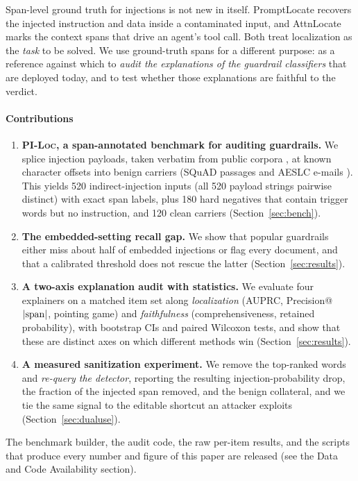 \documentclass{ieeeaccess}
\begin{document}
Span-level ground truth for injections is not new in itself. PromptLocate \cite{promptlocate2026} recovers the injected instruction and data inside a contaminated input, and AttnLocate \cite{attnlocate2026} marks the context spans that drive an agent's tool call. Both treat localization as the \emph{task} to be solved. We use ground-truth spans for a different purpose: as a reference against which to \emph{audit the explanations of the guardrail classifiers} that are deployed today, and to test whether those explanations are faithful to the verdict.

\paragraph*{Contributions}
\begin{enumerate}
\item \textbf{\textsc{PI-Loc}, a span-annotated benchmark for auditing guardrails.} We splice injection payloads, taken verbatim from public corpora \cite{deepsetpi,safeguardpi}, at known character offsets into benign carriers (SQuAD passages \cite{squad} and AESLC e-mails \cite{aeslc}). This yields 520 indirect-injection inputs (all 520 payload strings pairwise distinct) with exact span labels, plus 180 hard negatives that contain trigger words but no instruction, and 120 clean carriers (Section~\ref{sec:bench}).
\item \textbf{The embedded-setting recall gap.} We show that popular guardrails either miss about half of embedded injections or flag every document, and that a calibrated threshold does not rescue the latter (Section~\ref{sec:results}).
\item \textbf{A two-axis explanation audit with statistics.} We evaluate four explainers on a matched item set along \emph{localization} (AUPRC, Precision@$|{\rm span}|$, pointing game) and \emph{faithfulness} (comprehensiveness, retained probability), with bootstrap CIs and paired Wilcoxon tests, and show that these are distinct axes on which different methods win (Section~\ref{sec:results}).
\item \textbf{A measured sanitization experiment.} We remove the top-ranked words and \emph{re-query the detector}, reporting the resulting injection-probability drop, the fraction of the injected span removed, and the benign collateral, and we tie the same signal to the editable shortcut an attacker exploits (Section~\ref{sec:dualuse}).
\end{enumerate}
The benchmark builder, the audit code, the raw per-item results, and the scripts that produce every number and figure of this paper are released (see the Data and Code Availability section).
\end{document}
